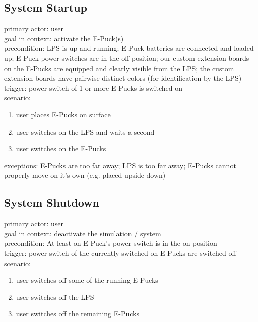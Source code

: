 \documentclass[a4paper,parskip,headheight=38pt]{scrartcl} %
\begin{document}
\subsection{System Startup}
primary actor: user \\
goal in context: activate the E-Puck(s) \\
precondition: LPS is up and running; E-Puck-batteries are connected and loaded up;
  E-Puck power switches are in the off position; our custom extension boards on the E-Pucks
  are equipped and clearly visible from the LPS; the custom extension boards have
  pairwise distinct colors (for identification by the LPS) \\
trigger: power switch of 1 or more E-Pucks is switched on \\
scenario:
\begin{enumerate}[label={\arabic*.}]
	\item user places E-Pucks on surface
	\item user switches on the LPS and waits a second
	\item user switches on the E-Pucks
\end{enumerate}
exceptions: E-Pucks are too far away; LPS is too far away; E-Pucks cannot properly move on it's own (e.g. placed upside-down) \\

\subsection{System Shutdown}
primary actor: user \\
goal in context: deactivate the simulation / system \\
precondition: At least on E-Puck's power switch is in the on position \\
trigger: power switch of the currently-switched-on E-Pucks are switched off \\
scenario:
\begin{enumerate}[label={\arabic*.}]
	\item user switches off some of the running E-Pucks
	\item user switches off the LPS
	\item user switches off the remaining E-Pucks
\end{enumerate}
\end{document}
